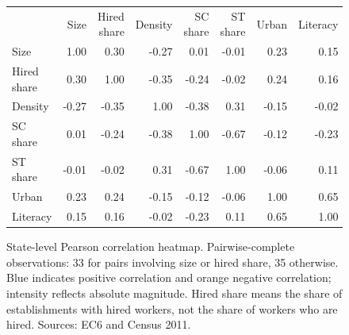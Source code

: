\documentclass[11pt,a4paper]{report}
\begin{document}
\clearpage\begin{figure}[p]\centering
\small\begin{tabular}{lrrrrrrr}\toprule
 & Size & Hired share & Density & SC share & ST share & Urban & Literacy \\
Size & \cellcolor{navy!40}1.00 & \cellcolor{navy!12}0.30 & \cellcolor{orange!11}-0.27 & \cellcolor{navy!0}0.01 & \cellcolor{orange!1}-0.01 & \cellcolor{navy!9}0.23 & \cellcolor{navy!6}0.15 \\
Hired share & \cellcolor{navy!12}0.30 & \cellcolor{navy!40}1.00 & \cellcolor{orange!14}-0.35 & \cellcolor{orange!10}-0.24 & \cellcolor{orange!1}-0.02 & \cellcolor{navy!10}0.24 & \cellcolor{navy!6}0.16 \\
Density & \cellcolor{orange!11}-0.27 & \cellcolor{orange!14}-0.35 & \cellcolor{navy!40}1.00 & \cellcolor{orange!15}-0.38 & \cellcolor{navy!13}0.31 & \cellcolor{orange!6}-0.15 & \cellcolor{orange!1}-0.02 \\
SC share & \cellcolor{navy!0}0.01 & \cellcolor{orange!10}-0.24 & \cellcolor{orange!15}-0.38 & \cellcolor{navy!40}1.00 & \cellcolor{orange!27}-0.67 & \cellcolor{orange!5}-0.12 & \cellcolor{orange!9}-0.23 \\
ST share & \cellcolor{orange!1}-0.01 & \cellcolor{orange!1}-0.02 & \cellcolor{navy!13}0.31 & \cellcolor{orange!27}-0.67 & \cellcolor{navy!40}1.00 & \cellcolor{orange!3}-0.06 & \cellcolor{navy!4}0.11 \\
Urban & \cellcolor{navy!9}0.23 & \cellcolor{navy!10}0.24 & \cellcolor{orange!6}-0.15 & \cellcolor{orange!5}-0.12 & \cellcolor{orange!3}-0.06 & \cellcolor{navy!40}1.00 & \cellcolor{navy!26}0.65 \\
Literacy & \cellcolor{navy!6}0.15 & \cellcolor{navy!6}0.16 & \cellcolor{orange!1}-0.02 & \cellcolor{orange!9}-0.23 & \cellcolor{navy!4}0.11 & \cellcolor{navy!26}0.65 & \cellcolor{navy!40}1.00 \\
\bottomrule\end{tabular}
\caption{State-level Pearson correlation heatmap. Pairwise-complete observations: 33 for pairs involving size or hired share, 35 otherwise. Blue indicates positive correlation and orange negative correlation; intensity reflects absolute magnitude. Hired share means the share of establishments with hired workers, not the share of workers who are hired. Sources: EC6 and Census 2011.}\end{figure}\clearpage
\end{document}

